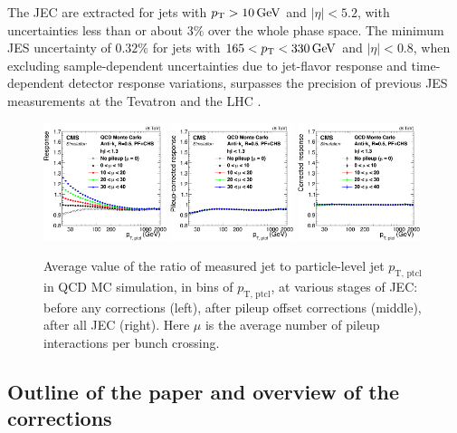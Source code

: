 \documentclass[11pt,twoside,a4paper,cmspaper,final,collab]{cms-tdr}
\begin{document}
The JEC are extracted for jets with $p_{\mathrm{T}}>10\,\text{Ge\hspace{-.08em}V}$ and $\vert \eta\vert <5.2$, with uncertainties less than or about $3\%$ over the whole phase space. The minimum JES uncertainty of $0.32\%$ for jets with $165 < p_{\mathrm{T}} < 330\,\text{Ge\hspace{-.08em}V}$ and $ \vert \eta \vert <0.8$, when excluding sample-dependent uncertainties due to jet-flavor response and time-dependent detector response variations, surpasses the precision of previous JES measurements
at the Tevatron \cite{CDF_JEC,D0_JEC} and the LHC \cite{JEC_JINST,ATLAS_JEC}.

\begin{figure}[htbp!]
\includegraphics[width=0.32\textwidth]{Figure_001-a.pdf}
\includegraphics[width=0.32\textwidth]{Figure_001-b.pdf}
\includegraphics[width=0.32\textwidth]{Figure_001-c.pdf}
\caption{Average value of the ratio of measured jet \pt to particle-level jet $p_\text{T, ptcl}$ in QCD MC simulation, in bins of $p_\text{T, ptcl}$, at various stages of JEC:
before any corrections (left),
after pileup offset corrections (middle),
after all JEC (right). Here $\mu$ is the average number of pileup interactions per bunch crossing.
}\label{fig:jecsteps}
\end{figure}

\subsection*{Outline of the paper and overview of the corrections}
\end{document}
